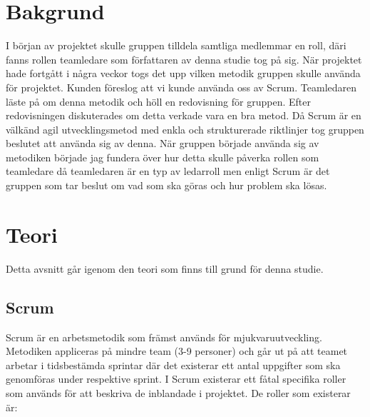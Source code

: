 \section{Bakgrund}
I början av projektet skulle gruppen tilldela samtliga medlemmar en roll, däri fanns rollen teamledare som författaren av denna studie tog på sig. När projektet hade fortgått i några veckor togs det upp vilken metodik gruppen skulle använda för projektet. Kunden föreslog att vi kunde använda oss av Scrum. Teamledaren läste på om denna metodik och höll en redovisning för gruppen. Efter redovisningen diskuterades om detta verkade vara en bra metod. Då Scrum är en välkänd agil utvecklingsmetod med enkla och strukturerade riktlinjer tog gruppen beslutet att använda sig av denna. När gruppen började använda sig av metodiken började jag fundera över hur detta skulle påverka rollen som teamledare då teamledaren är en typ av ledarroll men enligt Scrum är det gruppen som tar beslut om vad som ska göras och hur problem ska lösas.

\section{Teori}
Detta avsnitt går igenom den teori som finns till grund för denna studie.

\subsection{Scrum} \label{adam_scrum}
Scrum är en arbetsmetodik som främst används för mjukvaruutveckling. Metodiken appliceras på mindre team (3-9 personer) och går ut på att teamet arbetar i tidsbestämda sprintar där det existerar ett antal uppgifter som ska genomföras under respektive sprint.
I Scrum existerar ett fåtal specifika roller som används för att beskriva de inblandade i projektet. De roller som existerar är:

